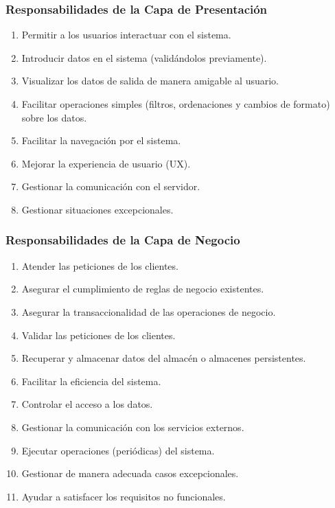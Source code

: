 \documentclass[a4paper,t,xcolor=pst,dvips,colortheme]{beamer}
\begin{document}
\begin{frame}[c]
	\frametitle{Responsabilidades de la Capa de Presentación}
	\begin{enumerate}[<+->]
        \item Permitir a los usuarios interactuar con el sistema.
        \item Introducir datos en el sistema (validándolos previamente).
        \item Visualizar los datos de salida de manera amigable al usuario.
        \item Facilitar operaciones simples (filtros, ordenaciones y cambios de formato) sobre los datos.
        \item Facilitar la navegación por el sistema.
        \item Mejorar la experiencia de usuario (UX). %
        \item Gestionar la comunicación con el servidor.
        \item Gestionar situaciones excepcionales.
	\end{enumerate}
\end{frame}

\begin{frame}[c]
	\frametitle{Responsabilidades de la Capa de Negocio}
	\begin{enumerate}[<+->]
        \item Atender las peticiones de los clientes.
        \item Asegurar el cumplimiento de \alert{reglas de negocio} existentes.
        \item Asegurar la \alert{transaccionalidad} de las operaciones de negocio.
        \item Validar las peticiones de los clientes.
        \item Recuperar y almacenar datos del almacén o almacenes persistentes.
        \item Facilitar la eficiencia del sistema.
        \item Controlar el acceso a los datos.
        \item Gestionar la comunicación con los servicios externos.
        \item Ejecutar operaciones (periódicas) del sistema.
        \item Gestionar de manera adecuada casos excepcionales.
        \item Ayudar a satisfacer los requisitos no funcionales.
	\end{enumerate}
\end{frame}
\end{document}
